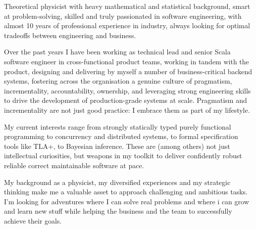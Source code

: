 
\begin{cvparagraph}
Theoretical physicist with heavy mathematical and statistical 
background, smart at problem-solving, skilled and truly passionated in software engineering, with almost 10 years of professional experience in industry, always looking for optimal tradeoffs between engineering and business.

  Over the past years I have been working as technical lead and senior Scala software engineer in cross-functional product teams, working in tandem with the product, designing and delivering by myself a number of business-critical backend systems, fostering  across the organisation a genuine culture of pragmatism, incrementality, accountability, ownership, and leveraging strong engineering skills 
  to drive the development of production-grade systems at scale. Pragmatism and incrementality are not just good practice: I embrace them as part of my lifestyle.

  My current interests range from strongly statically typed purely functional programming to concurrency and distributed systems, to formal specification tools like TLA+, to Bayesian inference. These are (among others) not just intellectual curiosities, but weapons in my toolkit to deliver confidently robust reliable correct maintainable software at pace. 

My background as a physicist, my diversified experiences and my strategic thinking make me a valuable asset to approach challenging and ambitious tasks. I'm looking for adventures where I can solve real problems and where i can grow and learn new stuff while helping the business and the team to successfully achieve their goals. 
\end{cvparagraph}
